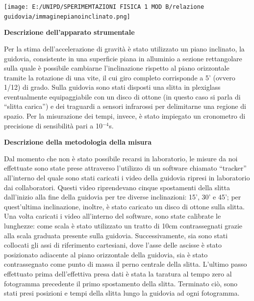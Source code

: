 \documentclass[a4paper,11pt,titlepage]{book}
\begin{document}
\texttt{[image: E:/UNIPD/SPERIMEMTAZIONI FISICA 1 MOD B/relazione guidovia/immaginepianoinclinato.png]} 

\newpage






\begin{center}
\begin{large}
\textbf{Descrizione dell'apparato strumentale}
\end{large}
\end{center}
\vspace{0.15cm}

\begin{flushleft}
Per la stima dell’accelerazione di gravità è stato utilizzato un piano inclinato, la guidovia, consistente in una superficie piana in alluminio a sezione rettangolare sulla quale è possibile cambiarne l’inclinazione rispetto al piano orizzontale tramite la rotazione di una vite, il cui giro completo corrisponde a 5’ (ovvero 1/12) di grado. Sulla guidovia sono stati disposti una slitta in plexiglass eventualmente equipaggiabile con un disco di ottone (in questo caso si parla di “slitta carica”) e dei traguardi a sensori infrarossi per delimitarne una regione di spazio. Per la misurazione dei tempi, invece, è stato impiegato un cronometro di precisione di sensibilità pari a 10$^{-4}$s.
\end{flushleft}
\vspace{2cm}


\begin{center}
\begin{large}
\textbf{Descrizione della metodologia della misura}
\end{large}
\end{center}
\vspace{0.15cm}


\begin{flushleft}
Dal momento che non è stato possibile recarsi in laboratorio, le misure da noi effettuate sono state prese attraverso l’utilizzo di un software chiamato “tracker” all’interno del quale sono stati caricati i video della guidovia ripresi in laboratorio dai collaboratori. Questi video riprendevano cinque spostamenti della slitta dall’inizio alla fine della guidovia per tre diverse inclinazioni: 15’, 30’ e 45’; per quest’ultima inclinazione, inoltre, è stato caricato un disco di ottone sulla slitta. Una volta caricati i video all’interno del software, sono state calibrate le lunghezze: come scala è stato utilizzato un tratto di 10cm contrassegnati grazie alla scala graduata presente sulla guidovia. Successivamente, sia sono stati collocati gli assi di riferimento cartesiani, dove l’asse delle ascisse è stato posizionato adiacente al piano orizzontale della guidovia, sia è stato contrassegnato come punto di massa il perno centrale della slitta. L’ultimo passo effettuato prima dell’effettiva presa dati è stata la taratura al tempo zero al fotogramma precedente il primo spostamento della slitta. Terminato ciò, sono stati presi posizioni e tempi della slitta lungo la guidovia ad ogni fotogramma. 
\end{flushleft}
\vspace{2cm}
\end{document}
